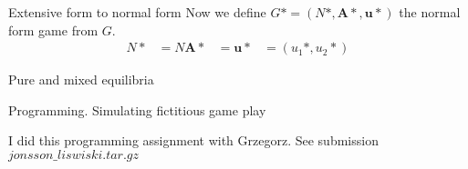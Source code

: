 \documentclass[12pt]{article}
\newenvironment{question}[2][Question]{\begin{trivlist}
\item[\hskip \labelsep {\bfseries #1}\hskip \labelsep {\bfseries #2.}]}{\end{trivlist}}
\newenvironment{answer}[2][Answer]{\begin{trivlist}
\item[\hskip \labelsep {\bfseries #1}\hskip \labelsep {\bfseries #2:}]}{\end{trivlist}}
\begin{document}
\begin{answer}{c)}{Extensive form to normal form}
Now we define $G*=(N*,\boldsymbol{A*}, \boldsymbol{u*})$ the normal form game from $G$.
\begin{align*}
N*&=N
\boldsymbol{A*}&=
\boldsymbol{u*}&=(u_1*,u_2*)
\end{align*}
\end{answer}
\begin{answer}{d)}
Pure and mixed equilibria
\end{answer}
\begin{question}{2}
Programming. Simulating fictitious game play
\end{question}
\begin{answer}{a)}
I did this programming assignment with Grzegorz.
See submission $jonsson\_liswiski.tar.gz$
\end{answer}
\end{document}
